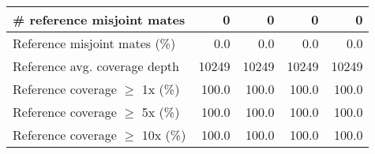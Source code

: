 \documentclass[12pt,a4paper]{article}
\begin{document}
\begin{table}[ht]
\begin{center}
\begin{tabular}{|l*{4}{|r}|}
\# reference misjoint mates & 0 & 0 & 0 & 0 \\ \hline
Reference misjoint mates (\%) & 0.0 & 0.0 & 0.0 & 0.0 \\ \hline
Reference avg. coverage depth & 10249 & 10249 & 10249 & 10249 \\ \hline
Reference coverage $\geq$ 1x (\%) & 100.0 & 100.0 & 100.0 & 100.0 \\ \hline
Reference coverage $\geq$ 5x (\%) & 100.0 & 100.0 & 100.0 & 100.0 \\ \hline
Reference coverage $\geq$ 10x (\%) & 100.0 & 100.0 & 100.0 & 100.0 \\ \hline
\end{tabular}
\end{center}
\end{table}
\end{document}
